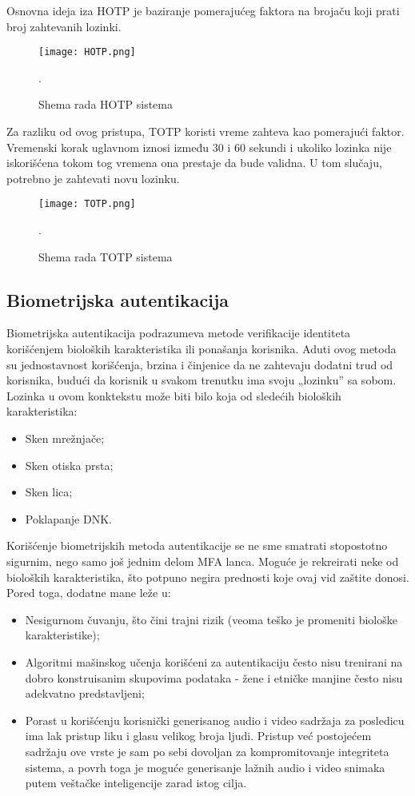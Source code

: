 \documentclass[fleqn, 12pt]{article}
\begin{document}
Osnovna ideja iza HOTP je baziranje pomerajućeg faktora na brojaču koji prati broj zahtevanih lozinki. 

\begin{figure}[H]
    \centering
    \texttt{[image: HOTP.png]}
    \caption{Shema rada HOTP sistema\cite{OTP}}.
    \label{fig:enter-label}
\end{figure}

Za razliku od ovog pristupa, TOTP koristi vreme zahteva kao pomerajući faktor. Vremenski korak uglavnom iznosi između 30 i 60 sekundi i ukoliko lozinka nije iskorišćena tokom tog vremena ona prestaje da bude validna. U tom slučaju, potrebno je zahtevati novu lozinku\cite{OTP}. 

\begin{figure}[H]
    \centering
    \texttt{[image: TOTP.png]}
    \caption{Shema rada TOTP sistema\cite{OTP}}.
    \label{fig:enter-label}
\end{figure}

\newpage
\subsection{Biometrijska autentikacija}
\indent Biometrijska autentikacija podrazumeva metode verifikacije identiteta korišćenjem bioloških karakteristika ili ponašanja korisnika. Aduti ovog metoda su jednostavnost korišćenja, brzina i činjenice da ne zahtevaju dodatni trud od korisnika, budući da korisnik u svakom trenutku ima svoju „lozinku'' sa sobom. Lozinka u ovom konktekstu može biti bilo koja od sledećih bioloških karakteristika:
\begin{itemize}
    \item Sken mrežnjače;
    \item Sken otiska prsta;
    \item Sken lica;
    \item Poklapanje DNK. 
\end{itemize}

Korišćenje biometrijskih metoda autentikacije se ne sme smatrati stopostotno sigurnim, nego samo još jednim delom MFA lanca. Moguće je rekreirati neke od bioloških karakteristika, što potpuno negira prednosti koje ovaj vid zaštite donosi\cite{bio}. Pored toga, dodatne mane leže u:

\begin{itemize}
    \item Nesigurnom čuvanju, što čini trajni rizik (veoma teško je promeniti biološke karakteristike);
    \item Algoritmi mašinskog učenja korišćeni za autentikaciju često nisu trenirani na dobro konstruisanim skupovima podataka - žene i etničke manjine često nisu adekvatno predstavljeni;
    \item Porast u korišćenju korisnički generisanog audio i video sadržaja za posledicu ima lak pristup liku i glasu velikog broja ljudi. Pristup već postojećem sadržaju ove vrste je sam po sebi dovoljan za kompromitovanje integriteta sistema, a povrh toga je moguće generisanje lažnih audio i video snimaka putem veštačke inteligencije zarad istog cilja.
\end{itemize}
\end{document}
